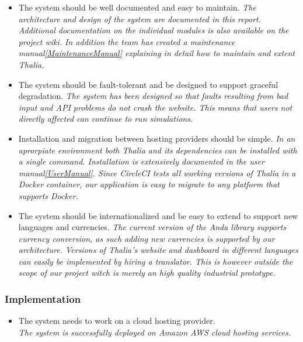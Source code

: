 \documentclass[main.tex]{subfiles}
\begin{document}
\begin{itemize}
\item The system should be well documented and easy to maintain.
\textit{The architecture and design of the system are documented in this report. Additional documentation on the individual modules is also available on the project wiki. In addition the team has created a maintenance manual\ref{MaintenanceManual} explaining in detail how to maintain and extent Thalia.}

\item The system should be fault-tolerant and be designed to support graceful degradation.
\textit{The system has been designed so that faults resulting from bad input and API problems do not crash the website. This means that users not directly affected can continue to run simulations.}

\item Installation and migration between hosting providers should be simple.
\textit{In an aprorpiate environment both Thalia and its dependencies can be installed with a single command. Installation is extensively documented in the user manual\ref{UserManual}. Since CircleCI tests all working versions of Thalia in a Docker container, our application is easy to migrate to any platform that supports Docker.}

\item The system should be internationalized and be easy to extend to support new languages and currencies.
\textit{The current version of the Anda library supports currency conversion, as such adding new currencies is supported by our architecture. Versions of Thalia's website and dashboard in different languages can easily be implemented by hiring a translator. This is however outside the scope of our project witch is merely an high quality industrial prototype.}

\end{itemize}



\subsubsection{Implementation}
\begin{itemize}

\item The system needs to work on a cloud hosting provider.\\
\textit{The system is successfully deployed on Amazon AWS cloud hosting services.}

\end{itemize}
\end{document}
